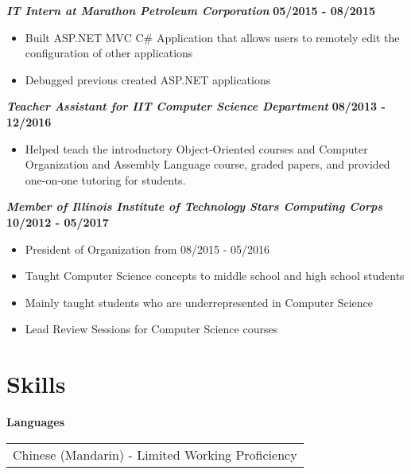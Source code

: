 \documentclass[margin=1in, 10pt]{res}
\begin{document}
\begin{resume}
	\textbf{\textit{IT Intern at Marathon Petroleum Corporation}} \hfill {\bf 05/2015
	- 08/2015}
	\begin{itemize}
  \setlength\itemsep{0em}
	  \item Built ASP.NET MVC C\# Application that allows users to remotely edit the configuration of other applications 
	  \item Debugged previous created ASP.NET applications
	\end{itemize}

	\textbf{\textit{Teacher Assistant for IIT Computer Science Department}} 
	\hfill {\bf 08/2013 - 12/2016}
	\begin{itemize}
	  \item Helped teach the introductory Object-Oriented courses and Computer Organization and Assembly Language course, graded papers, and provided one-on-one tutoring for students. 
	\end{itemize}
	
	\textbf{\textit{Member of Illinois Institute of Technology Stars Computing
	Corps}}
	\hfill {\bf 10/2012 - 05/2017}
	\begin{itemize}
  \setlength\itemsep{0em}
	  \item President of Organization from 08/2015 - 05/2016
	  \item Taught Computer Science concepts to middle school and high school students %
	  \item Mainly taught students who are underrepresented in Computer Science %
	  \item Lead Review Sessions for Computer Science courses 
	\end{itemize}
	
\section{Skills}
\textbf{Languages} \\ 
	\begin{tabular}{ l }
		Chinese (Mandarin) - Limited Working Proficiency
	\end{tabular}
	

\end{resume}
\end{document}
